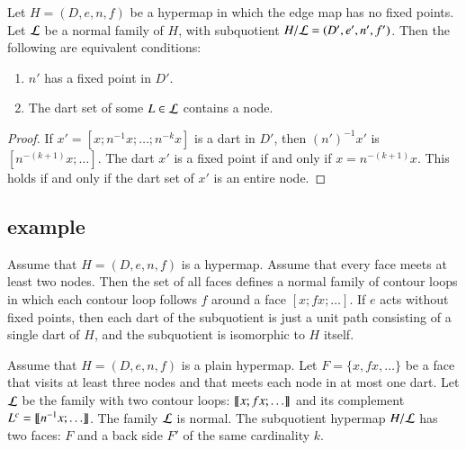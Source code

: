 \begin{lemma}\label{lemma:nfp}
Let $H=(D,e,n,f)$ be a hypermap in which the edge map has no fixed points.
Let ${\cal  L}$ be a normal family of $H$, with subquotient $H/{\cal L} = (D',e',n',f')$.  
Then the following are equivalent conditions:
\begin{enumerate}\wasitemize 
\item $n'$ has a fixed point in $D'$.
\item The dart set of some $L\in {\cal L}$ contains a node.
\end{enumerate}\wasitemize 
\end{lemma}

\begin{proof}
If $x'=[x;n^{-1} x;\ldots;n^{-k} x]$ is a dart in $D'$, then $(n')^{-1}x'$ is
$[n^{-(k+1)} x;\ldots]$.  The dart $x'$ is a fixed point if and only if
$x = n^{-(k+1)} x$.  This holds if and only if the dart set of $x'$ is an entire node.
\end{proof}

\subsection{example}

\begin{example}\label{ex:Hall} 
  Assume that $H=(D,e,n,f)$ is a
  hypermap. %
  Assume that every face meets at least two nodes. Then the set of all
  faces defines a normal family of contour loops in which each contour loop follows $f$ around
  a face $[x;f x;\ldots]$.  If $e$ acts without fixed points, then
  each dart of the subquotient is just a unit path consisting of a single
  dart of $H$, and the subquotient is isomorphic to $H$ itself.
\end{example}

\begin{example}\label{ex:H2} 
  Assume that $H=(D,e,n,f)$ is a plain hypermap.  Let $F = \{x,f x,\ldots\}$ be a face
  that visits at least three nodes and that meets each node in at most
  one dart.  Let $\cal L$ be the family with two contour loops: ${\llbracket{x;f x;\ldots}\rrbracket}$ 
and its complement $L^c = {\llbracket{n^{-1} x;\ldots}\rrbracket}$.
The family $\cal L$ is normal. The subquotient hypermap $H/{\cal L}$ has
two faces: $F$ and a back side $F'$ of the same cardinality $k$.
%
\end{example}

